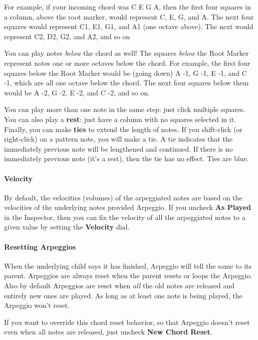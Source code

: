 \documentclass[twoside,10pt]{article}
\begin{document}
For example, if your incoming chord was C E G A, then the first four squares in a column, above the root marker, would represent C, E, G, and A.  The next four squares would represent C1, E1, G1, and A1 (one octave above).  The next would represent C2, D2, G2, and A2, and so on

You can play notes {\it below} the chord as well!  The squares {\it below} the Root Marker represent notes one or more octaves below the chord.  For example, the first four squares below the Root Marker would be (going down) A -1, G -1, E -1, and C -1, which are all one octave below the chord.  The next four squares below them would be A -2, G -2, E -2, and C -2, and so on.

You can play more than one note in the same step: just click multiple squares.  You can also play a {\bf rest}: just have a column with no squares selected in it.  Finally, you can make {\bf ties} to extend the length of notes.   If you shift-click (or right-click) on a pattern note, you will make a tie.  A tie indicates that the immediately previous note will be lengthened and continued.  If there is no immediately previous note (it's a rest), then the tie has no effect.  Ties are blue.

\paragraph{Velocity}

By default, the velocities (volumes) of the arpeggiated notes are based on the velocities of the underlying notes provided Arpeggio.  If you uncheck {\bf As Played} in the Inspector, then you can fix the velocity of all the arpeggiated notes to a given value by setting the {\bf Velocity} dial.

\paragraph{Resetting Arpeggios}

When the underlying child says it has finished, Arpeggio will tell the same to its parent.  Arpeggios are always reset when the parent resets or loops the Arpeggio.  Also by default Arpeggios are reset when {\it all} the old notes are released and entirely new ones are played. As long as at least one note is being played, the Arpeggio won't reset.

If you want to override this chord reset behavior, so that Arpeggio doesn't reset even when all notes are released, just uncheck {\bf New Chord Reset}.
\end{document}
